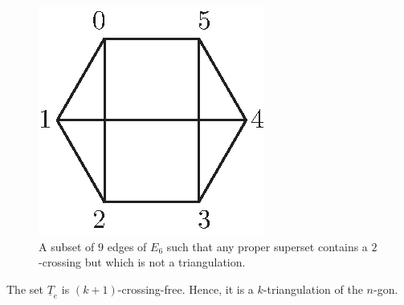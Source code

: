 \documentclass[12pt]{amsart}
\begin{document}
\begin{figure}
\centerline{\includegraphics[scale=1]{ctrexm2.eps}}
\caption{\small{A subset of $9$ edges of $E_6$ such that any proper superset contains a $2$-crossing but which is not a triangulation.}}\label{ctrexm2}
\end{figure}

\begin{lemma}
The set $\underline{T}_e$ is $(k+1)$-crossing-free. Hence, it is a $k$-triangulation of the $n$-gon.
\end{lemma}
\end{document}
